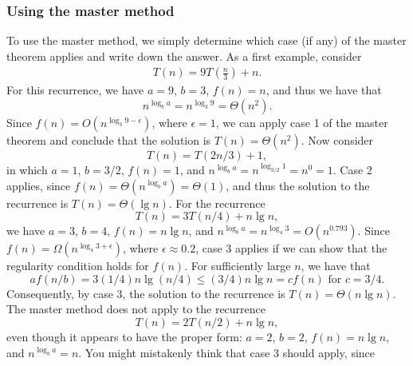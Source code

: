 \documentclass{report}
\begin{document}
        \subsubsection{Using the master method}
        \bigbreak \noindent 
        To use the master method, we simply determine which case (if any) of the master theorem applies and write down the answer.
        \bigbreak \noindent 
        As a first example, consider
        \begin{align*}
            T(n) = 9T\left(\frac{n}{3}\right) + n
        .\end{align*}
        \bigbreak \noindent 
        For this recurrence, we have \( a = 9 \), \( b = 3 \), \( f(n) = n \), and thus we have that 
        \[
            n^{\log_b a} = n^{\log_3 9} = \Theta(n^2).
        \]
        Since \( f(n) = O(n^{\log_3 9 - \epsilon}) \), where \( \epsilon = 1 \), we can apply case 1 of the master theorem and conclude that the solution is \( T(n) = \Theta(n^2) \).
        \bigbreak \noindent 
        Now consider 
        \[
            T(n) = T(2n/3) + 1,
        \]
        in which \( a = 1 \), \( b = 3/2 \), \( f(n) = 1 \), and \( n^{\log_b a} = n^{\log_{3/2} 1} = n^0 = 1 \). Case 2 applies, since \( f(n) = \Theta(n^{\log_b a}) = \Theta(1) \), and thus the solution to the recurrence is \( T(n) = \Theta(\lg n) \).
        \bigbreak \noindent 
        For the recurrence 
        \[
            T(n) = 3T(n/4) + n \lg n,
        \]
        we have \( a = 3 \), \( b = 4 \), \( f(n) = n \lg n \), and \( n^{\log_b a} = n^{\log_4 3} = O(n^{0.793}) \). Since \( f(n) = \Omega(n^{\log_4 3 + \epsilon}) \), where \( \epsilon \approx 0.2 \), case 3 applies if we can show that the regularity condition holds for \( f(n) \). For sufficiently large \( n \), we have that 
        \[
            a f(n/b) = 3(1/4)n \lg(n/4) \leq (3/4)n \lg n = c f(n) \text{ for } c = 3/4.
        \]
        Consequently, by case 3, the solution to the recurrence is \( T(n) = \Theta(n \lg n) \).
        \bigbreak \noindent 
        The master method does not apply to the recurrence 
        \[
            T(n) = 2T(n/2) + n \lg n,
        \]
        even though it appears to have the proper form: \( a = 2 \), \( b = 2 \), \( f(n) = n \lg n \), and \( n^{\log_b a} = n \). You might mistakenly think that case 3 should apply, since

        \bigbreak \noindent 
\end{document}
